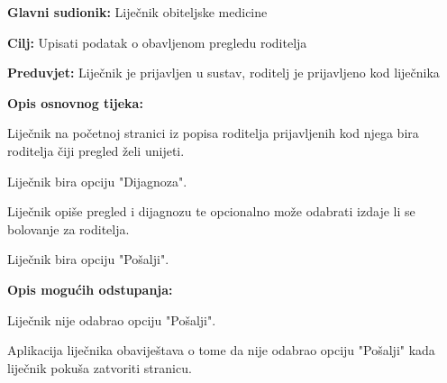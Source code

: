 					\noindent {}
					\begin{packed_item}
						
						\item \textbf{Glavni sudionik: }Liječnik obiteljske medicine
						\item  \textbf{Cilj:} Upisati podatak o obavljenom pregledu roditelja
						\item  \textbf{Preduvjet:} Liječnik je prijavljen u sustav, roditelj je prijavljeno kod liječnika
						\item  \textbf{Opis osnovnog tijeka:}
						
						\item[] \begin{packed_enum}
							
							\item Liječnik na početnoj stranici iz popisa roditelja prijavljenih kod njega bira roditelja čiji pregled želi unijeti.
							\item Liječnik bira opciju "Dijagnoza".
							\item Liječnik opiše pregled i dijagnozu te opcionalno može odabrati izdaje li se bolovanje za roditelja.
							\item Liječnik bira opciju "Pošalji".
						\end{packed_enum}
						
						\item  \textbf{Opis mogućih odstupanja:}
						
						\item[] \begin{packed_item}
							
							\item[4.a] Liječnik nije odabrao opciju "Pošalji".
							\item[] \begin{packed_enum}
								
								\item Aplikacija liječnika obaviještava o tome da nije odabrao opciju "Pošalji" kada liječnik pokuša zatvoriti stranicu.
							\end{packed_enum}
							
							
						\end{packed_item}
						
						
					\end{packed_item}
					
					
					
